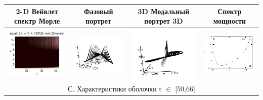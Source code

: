 \documentclass[12pt,letterpaper]{extreport}
\begin{document}
\begin{table}[H]
{\begin{tabular}{|c|c|c|c|}
\hline
\footnotesize 2-D Вейвлет спектр Морле&\footnotesize Фазовый портрет&\footnotesize 3D	Модальный портрет 3D&\footnotesize Спектр мощности\\
\hline
	\includegraphics[scale=1]{b1} 	
	&	
	\includegraphics[scale=0.9]{b2} 	
	&	
	\includegraphics[scale=0.9]{b3} 
	&
	\includegraphics[scale=0.9]{b4} 
\\
\hline

\multicolumn{4}{|c|}{С. Характеристики оболочки  t $\in$ [50,66]}\\


\end{tabular}}
\end{table}
\end{document}
